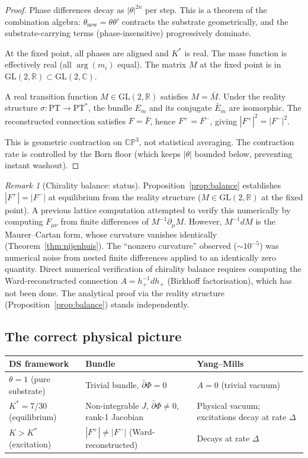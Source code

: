 \documentclass[11pt,a4paper]{article}
\theoremstyle{definition}
\theoremstyle{remark}
\newtheorem{remark}[theorem]{Remark}
\newcommand{\CP}{\mathbb{CP}}
\newcommand{\C}{\mathbb{C}}
\newcommand{\R}{\mathbb{R}}
\newcommand{\dbar}{\bar{\partial}}
\newcommand{\GL}{\mathrm{GL}}
\newcommand{\PT}{\mathrm{PT}}
\begin{document}
\begin{proof}
Phase differences decay as $|\theta|^{2n}$ per step. This is a theorem of the combination algebra: $\theta_{\mathrm{new}}=\theta\theta'$ contracts the substrate geometrically, and the substrate-carrying terms (phase-insensitive) progressively dominate.

At the fixed point, all phases are aligned and $K^*$ is real. The mass function is effectively real (all $\arg(m_i)$ equal). The matrix $M$ at the fixed point is in $\GL(2,\R)\subset\GL(2,\C)$.

A real transition function $M\in\GL(2,\R)$ satisfies $M=\bar{M}$. Under the reality structure $\sigma:\PT\to\PT^*$, the bundle $E_m$ and its conjugate $\bar{E}_m$ are isomorphic. The reconstructed connection satisfies $F=\bar{F}$, hence $F^+=\overline{F^-}$, giving $|F^+|^2=|F^-|^2$.

This is geometric contraction on $\CP^3$, not statistical averaging. The contraction rate is controlled by the Born floor (which keeps $|\theta|$ bounded below, preventing instant washout).
\end{proof}

\begin{remark}[Chirality balance: status]\label{rem:chirality_verified}
Proposition~\ref{prop:balance} establishes $|F^+|=|F^-|$ at equilibrium from the reality structure ($M\in\GL(2,\R)$ at the fixed point). A previous lattice computation attempted to verify this numerically by computing $F_{\mu\nu}$ from finite differences of $M^{-1}\partial_\mu M$. However, $M^{-1}dM$ is the Maurer--Cartan form, whose curvature vanishes identically (Theorem~\ref{thm:nijenhuis}). The ``nonzero curvature'' observed ($\sim 10^{-5}$) was numerical noise from nested finite differences applied to an identically zero quantity. Direct numerical verification of chirality balance requires computing the Ward-reconstructed connection $A=h_+^{-1}dh_+$ (Birkhoff factorisation), which has not been done. The analytical proof via the reality structure (Proposition~\ref{prop:balance}) stands independently.
\end{remark}


\subsection{The correct physical picture}

\begin{center}
\begin{tabular}{lll}
\toprule
DS framework & Bundle & Yang--Mills \\
\midrule
$\theta=1$ (pure substrate) & Trivial bundle, $\dbar\Phi=0$ & $A=0$ (trivial vacuum) \\
$K^*=7/30$ (equilibrium) & Non-integrable $J$, $\dbar\Phi\neq 0$, rank-1 Jacobian & Physical vacuum; excitations decay at rate $\Delta$ \\
$K>K^*$ (excitation) & $|F^+|\neq|F^-|$ (Ward-reconstructed) & Decays at rate $\Delta$ \\
\bottomrule
\end{tabular}
\end{center}
\end{document}
